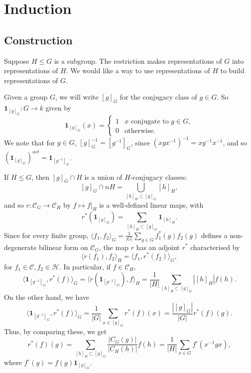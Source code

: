 \documentclass[12pt]{article}
\theoremstyle{definition}
\theoremstyle{remark}
\begin{document}
\newpage

\section{Induction}%
\label{sec:induction}

\subsection{Construction}%
\label{sub:construction}


Suppose $H \leq G$ is a subgroup. The restriction makes representations of $G$ into representations of $H$. We would like a way to use representations of $H$ to build representations of $G$.

Given a group $G$, we will write $[g]_{G}$ for the conjugacy class of $g \in G$. So $\mathbf{1}_{[g]_{G}} : G \to k$ given by
\[
	\mathbf{1}_{[g]_{G}}(x) =
	\begin{cases}
		1 & x \text{ conjugate to } g \in G, \\
		0 & \text{otherwise}.
	\end{cases}
\] 
We note that for $g \in G$, $[g]_{G}^{-1} = [g^{-1}]_{G}$, since $(xgx^{-1})^{-1} = xg^{-1}x^{-1}$, and so $(\mathbf{1}_{[g]_{G}})^{ast} = \mathbf{1}_{[g^{-1}]_{G}}$.

If $H \leq G$, then $[g]_{G} \cap H$ is a union of $H$-conjugacy classes:
\[
	[g]_{G} \cap n H = \bigcup_{[h]_H \subset [g]_{G}}[h]_{H}
,\]
and so $r : \mathcal{C}_G \to \mathcal{C}_H$ by $f \mapsto f|_H$ is a well-defined linear maps, with
\[
	r^{\ast}(\mathbf{1}_{[g]_{G}}) = \sum_{[h]_H \subset [g]_{G}} \mathbf{1}_{[h]_H}
.\]
Since for every finite group, $\langle f_1, f_2 \rangle_{G} = \frac{1}{|G|}\sum_{g \in G}f_1^{\ast}(g) f_2(g)$ defines a non-degenerate bilinear form on $\mathcal{C}_G$, the map $r$ has an adjoint $r^{\ast}$ characterised by
\[
	\langle r(f_1), f_2 \rangle_{H} = \langle f_1, r^{\ast}(f_2) \rangle_{G}
,\]
for $f_1 \in \mathcal{C}, f_2 \in \mathcal{H}$. In particular, if $f \in \mathcal{C}_H$,
\[
	\langle \mathbf{1}_{[g^{-1}]_{G}}, r^{\ast}(f) \rangle_{G} = \langle r (\mathbf{1}_{[g^{-1}]_{G}}), f \rangle_{H} = \frac{1}{|H|} \sum_{[h]_{H} \subset [g]_{G}} |[h]_{H}| f(h)
.\]
On the other hand, we have
\[
	\langle \mathbf{1}_{[g^{-1}]_{G}}, r^{\ast}(f) \rangle_{G} = \frac{1}{|G|} \sum_{x \in [g]_{G}}r^{\ast}(f)(x) = \frac{|[g]_{G}|}{|G|} r^{\ast}(f)(g)
.\]
Thus, by comparing these, we get
\[
	r^{\ast}(f)(g) = \sum_{[h]_H \subset [g]_{G}} \frac{|C_G(g)|}{|C_H(h)|}f(h) = \frac{1}{|H|}\sum_{x \in G}f^{\circ}(x^{-1}gx)
,\]
where $f^{\circ}(g) = f(g)\mathbf{1}_{[g]_G}$.
\end{document}
